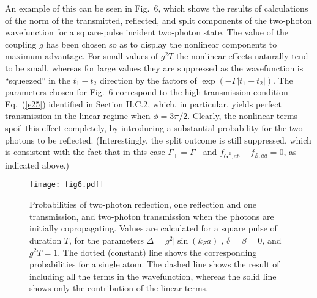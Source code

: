\documentclass[aps,pra,twocolumn,floatfix,superscriptaddress]{revtex4}
\begin{document}
An example of this can be seen in Fig.~6, which shows the results of calculations of the norm of the transmitted, reflected, and split components of the two-photon wavefunction for a square-pulse incident two-photon state.  The value of the coupling $g$ has been chosen so as to display the nonlinear components to maximum advantage.  For small values of $g^2 T$ the nonlinear effects naturally tend to be small, whereas for large values they are suppressed as the wavefunction is ``squeezed'' in the $t_1-t_2$ direction by the factors of $\exp(-\Gamma|t_1-t_2|)$.  The parameters chosen for Fig.~6 correspond to the high transmission condition Eq,~(\ref{e25}) identified in Section II.C.2, which, in particular, yields perfect transmission in the linear regime when $\phi = 3\pi/2$.  Clearly, the nonlinear terms spoil this effect completely, by introducing a substantial probability for the two photons to be reflected.  (Interestingly, the split outcome is still suppressed, which is consistent with the fact that in this case $\Gamma_+  = \Gamma_-$ and $f_{G^2,ab}+f_{\mathcal{E},aa}^{-} =0$, as indicated above.)


\begin{figure}
\texttt{[image: fig6.pdf]}
\caption{\label{fig6} Probabilities of two-photon reflection, one reflection and one transmission, and two-photon transmission when the photons are initially copropagating. Values are calculated for a square pulse of duration $T$, for the parameters $\Delta =g^2 |\sin(k_F a)|$, $\delta =\beta =0$, and $g^2 T=1$.  The dotted (constant) line shows the corresponding probabilities for a single atom. The dashed line shows the result of including all the terms in the wavefunction, whereas the solid line shows only the contribution of the linear terms.}  %
\end{figure}
\end{document}
